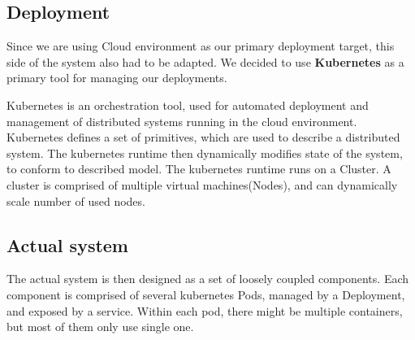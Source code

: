 \documentclass{ExcelAtFIT}
\begin{document}
    \subsection{Deployment}
    Since we are using Cloud environment as our primary deployment target, this side of the system also had to be adapted.
    We decided to use \textbf{Kubernetes} as a primary tool for managing our deployments.

    Kubernetes is an orchestration tool, used for automated deployment and management of distributed systems running in the cloud environment.
    Kubernetes defines a set of primitives, which are used to describe a distributed system. The kubernetes
    runtime then dynamically modifies state of the system, to conform to described model. The kubernetes runtime
    runs on a Cluster. A cluster is comprised of multiple virtual machines(Nodes), and can dynamically scale number
    of used nodes.
%
%

    \subsection{Actual system}
    The actual system is then designed as a set of loosely coupled components. Each component is comprised of several kubernetes Pods,
    managed by a Deployment, and exposed by a service. Within each pod, there might be multiple containers, but most of them only use single one.
\end{document}
